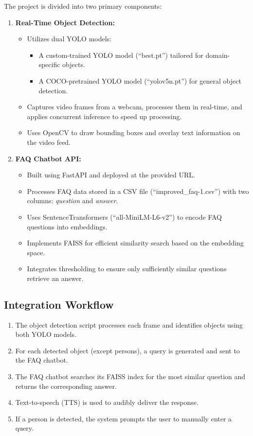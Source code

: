 \documentclass[12pt]{article}
\begin{document}
The project is divided into two primary components:
\begin{enumerate}[label=\arabic*.]
    \item \textbf{Real-Time Object Detection:}
    \begin{itemize}
        \item Utilizes dual YOLO models:
        \begin{itemize}
            \item A custom-trained YOLO model (``best.pt'') tailored for domain-specific objects.
            \item A COCO-pretrained YOLO model (``yolov5n.pt'') for general object detection.
        \end{itemize}
        \item Captures video frames from a webcam, processes them in real-time, and applies concurrent inference to speed up processing.
        \item Uses OpenCV to draw bounding boxes and overlay text information on the video feed.
    \end{itemize}
    
    \item \textbf{FAQ Chatbot API:}
    \begin{itemize}
        \item Built using FastAPI and deployed at the provided URL.
        \item Processes FAQ data stored in a CSV file (``improved\_faq-1.csv'') with two columns: \textit{question} and \textit{answer}.
        \item Uses SentenceTransformers (``all-MiniLM-L6-v2'') to encode FAQ questions into embeddings.
        \item Implements FAISS for efficient similarity search based on the embedding space.
        \item Integrates thresholding to ensure only sufficiently similar questions retrieve an answer.
    \end{itemize}
\end{enumerate}

\subsection{Integration Workflow}

\begin{enumerate}[label=\arabic*.]
    \item The object detection script processes each frame and identifies objects using both YOLO models.
    \item For each detected object (except persons), a query is generated and sent to the FAQ chatbot.
    \item The FAQ chatbot searches its FAISS index for the most similar question and returns the corresponding answer.
    \item Text-to-speech (TTS) is used to audibly deliver the response.
    \item If a person is detected, the system prompts the user to manually enter a query.
\end{enumerate}
\end{document}
